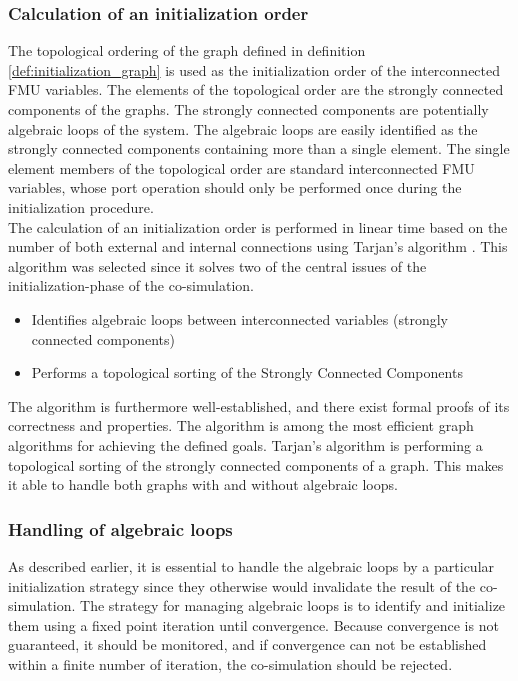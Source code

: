 \documentclass[runningheads]{llncs}
\begin{document}
\subsubsection{Calculation of an initialization order}
The topological ordering of the graph defined in definition \ref{def:initialization_graph} is used as the initialization order of the interconnected FMU variables. The elements of the topological order are the strongly connected components of the graphs. The strongly connected components are potentially algebraic loops of the system. The algebraic loops are easily identified as the strongly connected components containing more than a single element. The single element members of the topological order are standard interconnected FMU variables, whose port operation should only be performed once during the initialization procedure. \\
The calculation of an initialization order is performed in linear time based on the number of both external and internal connections using Tarjan's algorithm \cite{tarjan_1972}. This algorithm was selected since it solves two of the central issues of the initialization-phase of the co-simulation.
\begin{itemize}
    \item Identifies algebraic loops between interconnected variables (strongly connected components)
    \item Performs a topological sorting of the Strongly Connected Components
\end{itemize}
The algorithm is furthermore well-established, and there exist formal proofs of its correctness and properties\cite{stefan_merz}. The algorithm is among the most efficient graph algorithms for achieving the defined goals.  
Tarjan's algorithm is performing a topological sorting of the strongly connected components of a graph. This makes it able to handle both graphs with and without algebraic loops.


\subsubsection{Handling of algebraic loops}
As described earlier, it is essential to handle the algebraic loops by a particular initialization strategy since they otherwise would invalidate the result of the co-simulation. The strategy for managing algebraic loops is to identify and initialize them using a fixed point iteration until convergence. Because convergence is not guaranteed, it should be monitored, and if convergence can not be established within a finite number of iteration, the co-simulation should be rejected.
\end{document}

